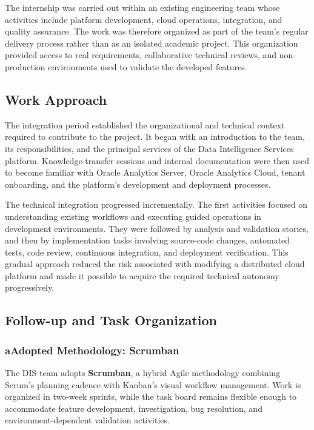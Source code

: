 The internship was carried out within an existing engineering team whose
activities include platform development, cloud operations, integration, and
quality assurance. The work was therefore organized as part of the team's
regular delivery process rather than as an isolated academic project. This
organization provided access to real requirements, collaborative technical
reviews, and non-production environments used to validate the developed
features.

\subsection{Work Approach}

The integration period established the organizational and technical context
required to contribute to the project. It began with an introduction to the
team, its responsibilities, and the principal services of the Data
Intelligence Services platform. Knowledge-transfer sessions and internal
documentation were then used to become familiar with Oracle Analytics Server,
Oracle Analytics Cloud, tenant onboarding, and the platform's development and
deployment processes.

The technical integration progressed incrementally. The first activities
focused on understanding existing workflows and executing guided operations in
development environments. They were followed by analysis and validation
stories, and then by implementation tasks involving source-code changes,
automated tests, code review, continuous integration, and deployment
verification. This gradual approach reduced the risk associated with modifying
a distributed cloud platform and made it possible to acquire the required
technical autonomy progressively.

\subsection{Follow-up and Task Organization}

\subsubsection*{a\quad Adopted Methodology: Scrumban}

The DIS team adopts \textbf{Scrumban}, a hybrid Agile methodology combining
Scrum's planning cadence with Kanban's visual workflow management. Work is
organized in two-week sprints, while the task board remains flexible enough to
accommodate feature development, investigation, bug resolution, and
environment-dependent validation activities.

